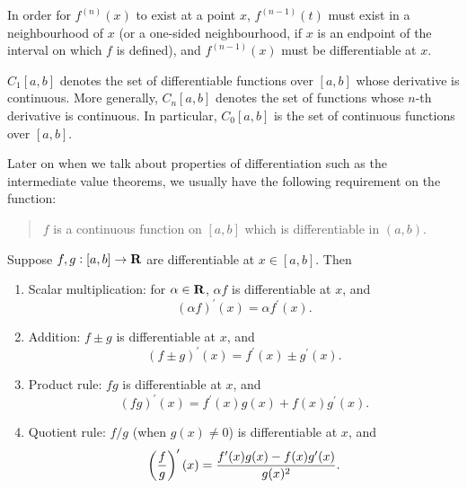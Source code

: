 \begin{remark}
In order for $f^{(n)}(x)$ to exist at a point $x$, $f^{(n-1)}(t)$ must exist in a neighbourhood of $x$ (or a one-sided neighbourhood, if $x$ is an endpoint of the interval on which $f$ is defined), and $f^{(n-1)}(x)$ must be differentiable at $x$.
\end{remark}

\begin{notation}
$C_1[a,b]$ denotes the set of differentiable functions over $[a,b]$ whose derivative is continuous. More generally, $C_n[a,b]$ denotes the set of functions whose $n$-th derivative is continuous. In particular, $C_0[a,b]$ is the set of continuous functions over $[a,b]$.
\end{notation}

Later on when we talk about properties of differentiation such as the intermediate value theorems, we usually have the following requirement on the function:
\begin{quote}
$f$ is a continuous function on $[a,b]$ which is differentiable in $(a,b)$.
\end{quote}

\begin{lemma}
Suppose $f,g:[a,b]\to\mathbf R$ are differentiable at $x\in[a,b]$. Then
\begin{enumerate}[label=(\roman*)]
\item Scalar multiplication: for $\alpha\in\mathbf R$, $\alpha f$ is differentiable at $x$, and
\[(\alpha f)^\prime(x)=\alpha f^\prime(x).\]
\item Addition: $f\pm g$ is differentiable at $x$, and
\[(f\pm g)^\prime(x)=f^\prime(x)\pm g^\prime(x).\]
\item Product rule: $fg$ is differentiable at $x$, and
\[(fg)^\prime(x)=f^\prime(x)g(x)+f(x)g^\prime(x).\]
\item Quotient rule: $f/g$ (when $g(x)\neq0$) is differentiable at $x$, and
\[\left(\frac{f}{g}\right)^\prime(x)=\frac{f^\prime(x)g(x)-f(x)g^\prime(x)}{g(x)^2}.\]
\end{enumerate}
\end{lemma}

